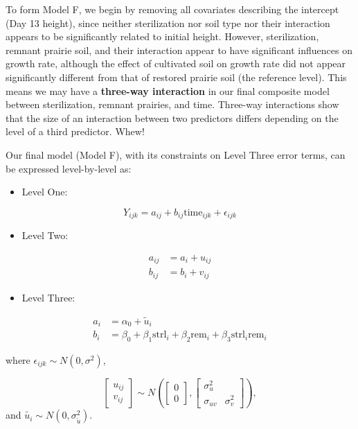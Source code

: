 \documentclass[
]{krantz}
\providecommand{\tightlist}{%
  \setlength{\itemsep}{0pt}\setlength{\parskip}{0pt}}
\begin{document}
To form Model F, we begin by removing all covariates describing the intercept (Day 13 height), since neither sterilization nor soil type nor their interaction appears to be significantly related to initial height. However, sterilization, remnant prairie soil, and their interaction appear to have significant influences on growth rate, although the effect of cultivated soil on growth rate did not appear significantly different from that of restored prairie soil (the reference level). This means we may have a \textbf{three-way interaction}  in our final composite model between sterilization, remnant prairies, and time. Three-way interactions show that the size of an interaction between two predictors differs depending on the level of a third predictor. Whew!

Our final model (Model F), with its constraints on Level Three error terms, can be expressed level-by-level as:

\begin{itemize}
\tightlist
\item
  Level One:
\end{itemize}

\begin{equation*}
Y_{ijk} = a_{ij}+b_{ij}\textrm{time}_{ijk}+\epsilon_{ijk}
\end{equation*}

\begin{itemize}
\tightlist
\item
  Level Two:
\end{itemize}

\begin{align*}
a_{ij} & = a_{i}+u_{ij} \\
b_{ij} & = b_{i}+v_{ij}
\end{align*}

\begin{itemize}
\tightlist
\item
  Level Three:
\end{itemize}

\begin{align*}
a_{i} & = \alpha_{0} + \tilde{u}_{i} \\
b_{i} & = \beta_{0}+\beta_{1}\textrm{strl}_{i}+\beta_{2}\textrm{rem}_{i} + \beta_{3}\textrm{strl}_{i}\textrm{rem}_{i}
\end{align*}

where \(\epsilon_{ijk}\sim N(0,\sigma^2)\),

\[ \left[ \begin{array}{c}
            u_{ij} \\ v_{ij}
          \end{array}  \right] \sim N \left( \left[
          \begin{array}{c}
            0 \\ 0
          \end{array} \right], \left[
          \begin{array}{cc}
            \sigma_{u}^{2} & \\
            \sigma_{uv} & \sigma_{v}^{2}
          \end{array} \right] \right), \]
and \(\tilde{{u}_{i}}\sim N(0,\sigma_{\tilde{u}}^{2})\).
\end{document}
